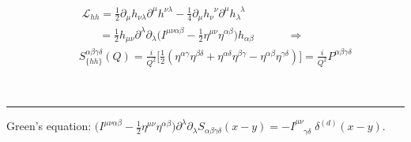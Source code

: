 \documentclass[aspectratio=169,usenames,dvipsnames]{beamer}
\begin{document}
\begin{frame}
\begin{minipage}{.2\textwidth}
  \centering
\end{minipage}
\centering\begin{minipage}{.79\textwidth}
		\begin{align*}
      & \quad\;  \mathcal{L}_{hh} =  \frac{1}{2} \partial_{\mu} h_{\nu \lambda} \partial^{\mu} h^{\nu \lambda} - \frac{1}{4} \partial_{\mu} h_{\nu}^{\;\;\nu} \partial^{\mu} h_{\lambda}^{\;\;\lambda} \\
      & \quad\quad\;\;\; = \frac{1}{2} h_{\mu\nu} \partial^{\lambda} \partial_{\lambda} \Big (  I^{\mu\nu\alpha\beta} - \frac{1}{2} \eta^{\mu\nu} \eta^{\alpha\beta}     \Big ) h_{\alpha\beta}  \quad\qquad \Rightarrow \quad \\[2mm]
      &  \quad  S_{\{hh\}}^{\alpha\beta\gamma\delta}(Q) =  \frac{i}{Q^2} \Bigg [ \frac{1}{2} (\eta^{\alpha
        \gamma} \eta^{\beta \delta} + \eta^{\alpha \delta} \eta^{\beta \gamma} -
      \eta^{\alpha \beta} \eta^{\gamma \delta}) \Bigg ] = \frac{i}{Q^2} P^{\alpha
        \beta \gamma \delta} 
		\end{align*}
\end{minipage}\\[3.5mm]

\textcolor{LUCopper}{\rule{\textwidth}{1pt}}
\raggedright\tiny Green's equation: $ \Big (  I^{\mu\nu\alpha\beta} - \frac{1}{2} \eta^{\mu\nu} \eta^{\alpha\beta} \Big ) \partial^{\lambda} \partial_{\lambda} S_{\alpha\beta\gamma\delta} (x-y) = - I^{\mu\nu}_{\;\;\;\;\gamma\delta} \; \delta^{(d)} (x-y) $.
\vspace{100mm}
\end{frame}
\end{document}
